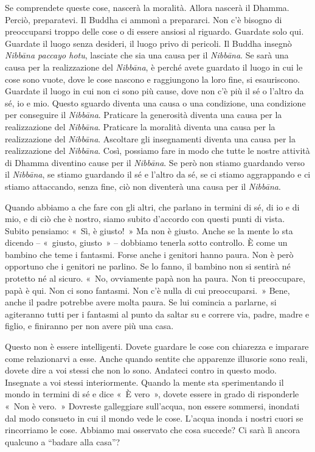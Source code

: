 Se comprendete queste cose, nascerà la moralità. Allora nascerà il
Dhamma. Perciò, preparatevi. Il Buddha ci ammonì a prepararci. Non c'è
bisogno di preoccuparsi troppo delle cose o di essere ansiosi al
riguardo. Guardate solo qui. Guardate il luogo senza desideri, il luogo
privo di pericoli. Il Buddha insegnò \emph{Nibbāna paccayo hotu},
lasciate che sia una causa per il \emph{Nibbāna}. Se sarà una causa per
la realizzazione del \emph{Nibbāna}, è perché avete guardato il luogo in
cui le cose sono vuote, dove le cose nascono e raggiungono la loro fine,
si esauriscono. Guardate il luogo in cui non ci sono più cause, dove non
c'è più il sé o l'altro da sé, io e mio. Questo sguardo diventa una
causa o una condizione, una condizione per conseguire il \emph{Nibbāna}.
Praticare la generosità diventa una causa per la realizzazione del
\emph{Nibbāna}. Praticare la moralità diventa una causa per la
realizzazione del \emph{Nibbāna}. Ascoltare gli insegnamenti diventa una
causa per la realizzazione del \emph{Nibbāna}. Così, possiamo fare in
modo che tutte le nostre attività di Dhamma diventino cause per il
\emph{Nibbāna}. Se però non stiamo guardando verso il \emph{Nibbāna}, se
stiamo guardando il sé e l'altro da sé, se ci stiamo aggrappando e ci
stiamo attaccando, senza fine, ciò non diventerà una causa per il
\emph{Nibbāna}.

Quando abbiamo a che fare con gli altri, che parlano in termini di sé,
di io e di mio, e di ciò che è nostro, siamo subito d'accordo con questi
punti di vista. Subito pensiamo: «~Sì, è giusto!~» Ma non è giusto.
Anche se la mente lo sta dicendo -- «~giusto, giusto~» -- dobbiamo
tenerla sotto controllo. È come un bambino che teme i fantasmi. Forse
anche i genitori hanno paura. Non è però opportuno che i genitori ne
parlino. Se lo fanno, il bambino non si sentirà né protetto né al
sicuro. «~No, ovviamente papà non ha paura. Non ti preoccupare, papà è
qui. Non ci sono fantasmi. Non c'è nulla di cui preoccuparsi.~» Bene,
anche il padre potrebbe avere molta paura. Se lui comincia a parlarne,
si agiteranno tutti per i fantasmi al punto da saltar su e correre via,
padre, madre e figlio, e finiranno per non avere più una casa.

Questo non è essere intelligenti. Dovete guardare le cose con chiarezza
e imparare come relazionarvi a esse. Anche quando sentite che apparenze
illusorie sono reali, dovete dire a voi stessi che non lo sono. Andateci
contro in questo modo. Insegnate a voi stessi interiormente. Quando la
mente sta sperimentando il mondo in termini di sé e dice «~È vero~»,
dovete essere in grado di risponderle «~Non è vero.~» Dovreste
galleggiare sull'acqua, non essere sommersi, inondati dal modo consueto
in cui il mondo vede le cose. L'acqua inonda i nostri cuori se
rincorriamo le cose. Abbiamo mai osservato che cosa succede? Ci sarà lì
ancora qualcuno a ``badare alla casa''?

